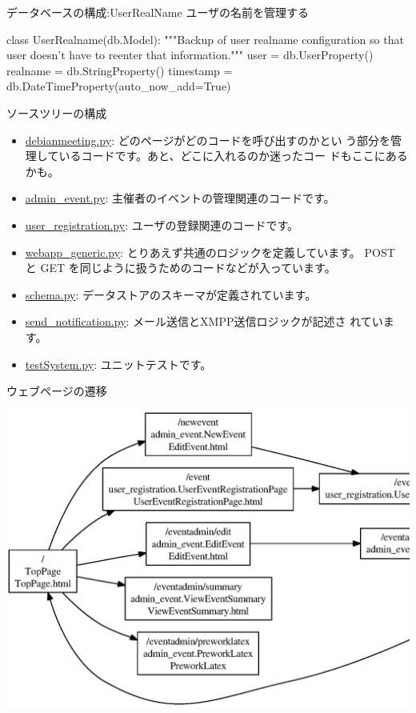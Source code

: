 \begin{frame}[containsverbatim]{データベースの構成:UserRealName}
ユーザの名前を管理する

\begin{commandline}
class UserRealname(db.Model):
    """Backup of user realname configuration so that user doesn't have to reenter that information."""
    user = db.UserProperty()
    realname = db.StringProperty()
    timestamp = db.DateTimeProperty(auto_now_add=True)
\end{commandline}
\end{frame}

\begin{frame}{ソースツリーの構成}
\begin{itemize}
 \item \url{debianmeeting.py}: どのページがどのコードを呼び出すのかとい
       う部分を管理しているコードです。あと、どこに入れるのか迷ったコー
       ドもここにあるかも。
 \item \url{admin_event.py}: 主催者のイベントの管理関連のコードです。
 \item \url{user_registration.py}: ユーザの登録関連のコードです。
 \item \url{webapp_generic.py}: とりあえず共通のロジックを定義しています。
       POST と GET を同じように扱うためのコードなどが入っています。
 \item \url{schema.py}: データストアのスキーマが定義されています。
 \item \url{send_notification.py}: メール送信とXMPP送信ロジックが記述さ
       れています。
 \item \url{testSystem.py}: ユニットテストです。
\end{itemize}
\end{frame}

\begin{frame}{ウェブページの遷移}

\includegraphics[width=1\hsize]{image201001/debian-reservation-flow.eps}
 
\end{frame}

